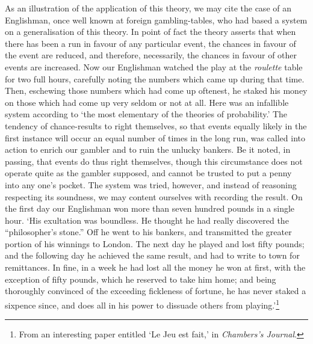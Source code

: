\documentclass[letterpaper,12pt,oneside,openany]{memoir}
\begin{document}
As an illustration of the application of this theory,
we may cite the case of an Englishman, once well
known at foreign gambling-tables, who had based a
system on a generalisation of this theory. In point of
fact the theory asserts that when there has been a run
in favour of any particular event, the chances in favour
of the event are reduced, and therefore, necessarily,
the chances in favour of other events are increased.
Now our Englishman watched the play at the \textit{roulette}
table for two full hours, carefully noting the numbers
which came up during that time. Then, eschewing
those numbers which had come up oftenest, he staked
his money on those which had come up very seldom or
not at all. Here was an infallible system according
to `the most elementary of the theories of probability.'
The tendency of chance-results to right themselves, so
that events equally likely in the first instance will
occur an equal number of times in the long run, was
called into action to enrich our gambler and to ruin
the unlucky bankers. Be it noted, in passing, that
events do thus right themselves, though this circumstance
does not operate quite as the gambler supposed,
and cannot be trusted to put a penny into any one's
pocket. The system was tried, however, and instead
of reasoning respecting its soundness, we may content
ourselves with recording the result. On the first day
our Englishman won more than seven hundred pounds
in a single hour. `His exultation was boundless. He
thought he had really discovered the ``philosopher's
stone.'' Off he went to his bankers, and transmitted
the greater portion of his winnings to London. The
next day he played and lost fifty pounds; and the
following day he achieved the same result, and had to
write to town for remittances. In fine, in a week he
had lost all the money he won at first, with the
exception of fifty pounds, which he reserved to take
him home; and being thoroughly convinced of the
exceeding fickleness of fortune, he has never staked a
sixpence since, and does all in his power to dissuade
others from playing.'\footnote{From an interesting paper entitled `Le Jeu est fait,' in
\textit{Chambers's Journal}.}
\end{document}
